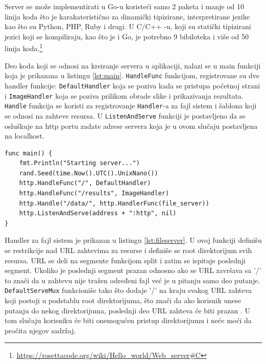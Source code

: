 \documentclass[12pt,oneside]{memoir}
\begin{document}
Server se može implementirati u Go-u  koristeći samo 2 paketa i manje od 10 linija koda što je karakateristično za dinamički tipizirane, interpretirane jezike kao što su Python, PHP, Ruby i drugi. U C/C++ -u, koji su statički tipizirani jezici koji se kompiliraju, kao što je i Go, je potrebno 9 bibiloteka i više od 50 linija koda.\footnote{\url{https://rosettacode.org/wiki/Hello_world/Web_server\#C}}

Deo koda koji se odnosi na kreiranje servera u aplikaciji, nalazi se u main funkciji koja je prikazana u listingu \ref{lst:main}. \texttt{HandleFunc} funkcijom, registrovane su dve handler funkcije: \texttt{DefaultHandler} koja se poziva kada se pristupa početnoj strani i \texttt{ImageHandler} koja se poziva prilikom obrade slike i prikazivanja rezultata. \texttt{Handle} funkcija se koristi za registrovanje \texttt{Handler}-a za fajl sistem i šablona koji se odnosi na zahteve resursa.  U \texttt{ListenAndServe} funkciji je postavljeno da se osluškuje na http portu zadate adrese servera koja je u ovom slučaju postavljena na localhost.

\begin{center}
\begin{lstlisting}[caption={Main funkcija, kreiranje servera},label={lst:main},  backgroundcolor=\color{background}]
func main() {
	fmt.Println("Starting server...")
	rand.Seed(time.Now().UTC().UnixNano())
	http.HandleFunc("/", DefaultHandler)
	http.HandleFunc("/results", ImageHandler)
	http.Handle("/data/", http.HandlerFunc(file_server))
	http.ListenAndServe(address + ":http", nil)
}
\end{lstlisting}
\end{center}

\label{fileserver}Handler za fajl sistem je prikazan u listingu \ref{lst:fileserver}. U ovoj funkciji definišu se restrikcije nad URL zahtevima za resurse i definiše se root direktorijum svih resursa. URL se deli na segmente funkcijom split i zatim se ispituje poslednji segment. Ukoliko je poslednji segment prazan odnosno ako se URL završava sa '/' to znači da u zahtevu nije tražen određeni fajl već je u pitanju samo deo putanje. \texttt{DefaultServeMux} funkcioniše tako što dodaje '/' na kraju svakog URL zahteva koji postoji u podstablu root direktorijuma, što znači da ako korisnik unese putanju do nekog direktorijuma, poslednji deo URL zahteva će biti prazan \cite{http}. U tom slučaju korisniku će biti onemogućen pristup direktorijumu i neće moći da pročita njegov sadržaj.

\newpage
\end{document}
